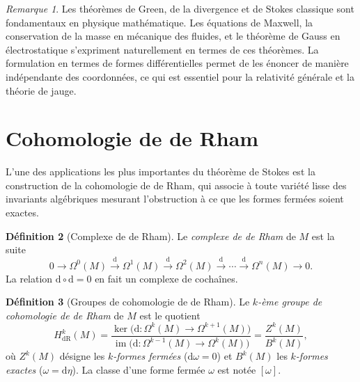 \documentclass[12pt,a4paper,openany]{book}
\theoremstyle{definition}
\newtheorem{definition}{Définition}[chapter]
\theoremstyle{plain}
\theoremstyle{remark}
\newtheorem{remarque}[definition]{Remarque}
\DeclareMathOperator{\im}{im}
\newcommand{\dd}{\mathrm{d}}
\begin{document}
\begin{remarque}\label{rem:stokes-physique}
Les théorèmes de Green, de la divergence et de Stokes classique sont
fondamentaux en physique mathématique. Les équations de Maxwell, la
conservation de la masse en mécanique des fluides, et le théorème de Gauss
en électrostatique s'expriment naturellement en termes de ces théorèmes.
La formulation en termes de formes différentielles permet de les énoncer de
manière indépendante des coordonnées, ce qui est essentiel pour la
relativité générale et la théorie de jauge.
\end{remarque}

\section{Cohomologie de de Rham}\label{sec:de-rham}

L'une des applications les plus importantes du théorème de Stokes est la
construction de la cohomologie de de Rham,
qui associe à toute variété lisse des invariants algébriques mesurant
l'obstruction à ce que les formes fermées soient exactes.

\begin{definition}[Complexe de de Rham]\label{def:complexe-de-rham}
Le \emph{complexe de de Rham} de $M$ est la suite
\[
  0 \to \Omega^0(M) \xrightarrow{\dd} \Omega^1(M)
  \xrightarrow{\dd} \Omega^2(M) \xrightarrow{\dd} \cdots
  \xrightarrow{\dd} \Omega^n(M) \to 0.
\]
La relation $\dd \circ \dd = 0$ en fait un complexe de cochaînes.
\end{definition}

\begin{definition}[Groupes de cohomologie de de Rham]\label{def:cohomologie-de-rham}
Le \emph{$k$-ème groupe de cohomologie de de Rham} de $M$ est le quotient
\[
  H^k_{\mathrm{dR}}(M)
  = \frac{\ker\bigl(\dd \colon \Omega^k(M) \to \Omega^{k+1}(M)\bigr)}
         {\im\bigl(\dd \colon \Omega^{k-1}(M) \to \Omega^k(M)\bigr)}
  = \frac{Z^k(M)}{B^k(M)},
\]
où $Z^k(M)$ désigne les \emph{$k$-formes fermées}
($\dd\omega = 0$) et $B^k(M)$ les \emph{$k$-formes exactes}
($\omega = \dd\eta$). La classe d'une forme fermée $\omega$ est notée $[\omega]$.
\end{definition}
\end{document}
